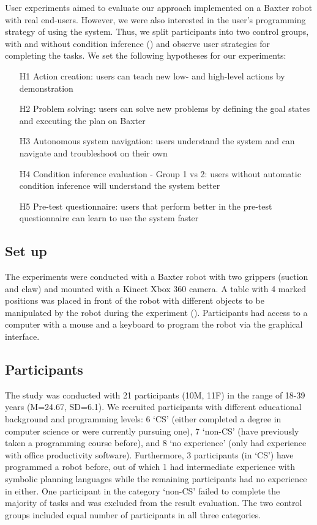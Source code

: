 User experiments aimed to evaluate our approach implemented on a Baxter robot with real end-users.
However, we were also interested in the user's programming strategy of using the system.
Thus, we split participants into two control groups, with and without condition inference () and observe user strategies for completing the tasks.
We set the following hypotheses for our experiments:
\begin{enumerate}
    \item[H1] Action creation: users can teach new low- and high-level actions by demonstration
    \item[H2] Problem solving: users can solve new problems by defining the goal states and executing the plan on Baxter
    \item[H3] Autonomous system navigation: users understand the system and can navigate and troubleshoot on their own
    \item[H4] Condition inference evaluation - Group 1 vs 2: users without automatic condition inference will understand the system better
    \item[H5] Pre-test questionnaire: users that perform better in the pre-test questionnaire can learn to use the system faster
\end{enumerate}

\subsection{Set up}
The experiments were conducted with a Baxter robot with two grippers (suction and claw) and mounted with a Kinect Xbox 360 camera. 
A table with 4 marked positions was placed in front of the robot with different objects to be manipulated by the robot during the experiment ().
Participants had access to a computer with a mouse and a keyboard to program the robot via the graphical interface.

\subsection{Participants}
The study was conducted with 21 participants (10M, 11F) in the range of 18-39 years (M=24.67, SD=6.1).
We recruited participants with different educational background and programming levels: 
6 `CS' (either completed a degree in computer science or were currently pursuing one),
7 `non-CS' (have previously taken a programming course before), 
and 8 `no experience' (only had experience with office productivity software).
Furthermore, 3 participants (in `CS') have programmed a robot before, out of which 1 had intermediate experience with symbolic planning languages while the remaining participants had no experience in either.
One participant in the category `non-CS' failed to complete the majority of tasks and was excluded from the result evaluation.
The two control groups included equal number of participants in all three categories.


